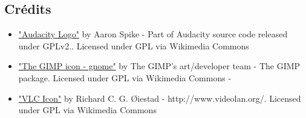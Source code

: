 
\subsection{Crédits}

\begin{itemize}[label=$\bullet$]
\item 
\href{https://commons.wikimedia.org/wiki/File:Audacity_Logo.svg#/media/File:Audacity_Logo.svg}{"Audacity Logo"} 
by Aaron Spike - Part of Audacity source code 
released under GPLv2.. Licensed under GPL via Wikimedia Commons

\item 
\href{https://commons.wikimedia.org/wiki/File:The_GIMP_icon_-_gnome.svg#/media/File:The_GIMP_icon_-_gnome.svg}{"The GIMP icon - gnome"} 
by The GIMP's art/developer team - The 
GIMP package. Licensed under GPL via Wikimedia Commons - 

\item 
\href{https://commons.wikimedia.org/wiki/File:VLC_Icon.svg#/media/File:VLC_Icon.svg}{"VLC Icon"} 
by Richard C. G. Øiestad - http://www.videolan.org/. 
Licensed under GPL via Wikimedia Commons

\end{itemize}
